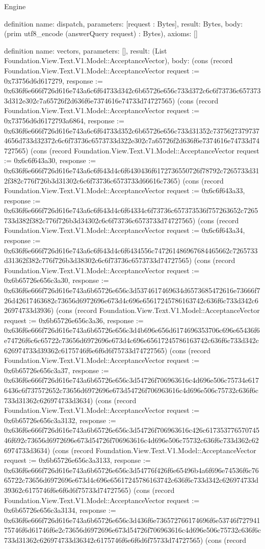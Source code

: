 \begin{lexlean}{Engine}
\begin{semanticmodule}
definition{
  name: dispatch,
  parameters: [request : Bytes],
  result: Bytes,
  body: (prim utf8_encode (answerQuery request) : Bytes),
  axioms: []
}

definition{
  name: vectors,
  parameters: [],
  result: (List Foundation.View.Text.V1.Model::AcceptanceVector),
  body: (cons (record Foundation.View.Text.V1.Model::AcceptanceVector {request := 0x73756d6d617279, response := 0x636f6e666f726d616e743a6c6f64733d342c6b65726e656c733d372c6c6f73736c6573733d312e302c7a65726f2d636f6e7374616e74733d74727565}) (cons (record Foundation.View.Text.V1.Model::AcceptanceVector {request := 0x73756d6d6172793a6864, response := 0x636f6e666f726d616e743a6c6f64733d352c6b65726e656c733d31352c73756273797374656d733d32372c6c6f73736c6573733d322e302c7a65726f2d636f6e7374616e74733d74727565}) (cons (record Foundation.View.Text.V1.Model::AcceptanceVector {request := 0x6c6f643a30, response := 0x636f6e666f726d616e743a6c6f643d4c6f6430436f6172736550726f78792c7265733d312f382c776f726b3d31302c6c6f73736c6573733d66616c7365}) (cons (record Foundation.View.Text.V1.Model::AcceptanceVector {request := 0x6c6f643a33, response := 0x636f6e666f726d616e743a6c6f643d4c6f64334c6f73736c657373536f757263652c7265733d382f382c776f726b3d34302c6c6f73736c6573733d74727565}) (cons (record Foundation.View.Text.V1.Model::AcceptanceVector {request := 0x6c6f643a34, response := 0x636f6e666f726d616e743a6c6f643d4c6f6434556c747261486967684465662c7265733d31362f382c776f726b3d38302c6c6f73736c6573733d74727565}) (cons (record Foundation.View.Text.V1.Model::AcceptanceVector {request := 0x6b65726e656c3a30, response := 0x636f6e666f726d616e743a6b65726e656c3d5374617469634d6573685472616e73666f726d42617463682c73656d6972696e673d4c696e65617245786163742c636f6c733d342c626974733d3936}) (cons (record Foundation.View.Text.V1.Model::AcceptanceVector {request := 0x6b65726e656c3a36, response := 0x636f6e666f726d616e743a6b65726e656c3d4b696e656d6174696353706c696e65436f6e74726f6c6c65722c73656d6972696e673d4c696e65617245786163742c636f6c733d342c626974733d39362c6175746f6e6f6d6f75733d74727565}) (cons (record Foundation.View.Text.V1.Model::AcceptanceVector {request := 0x6b65726e656c3a37, response := 0x636f6e666f726d616e743a6b65726e656c3d54726f706963616c4d696e506c75734e6176436c6f737572652c73656d6972696e673d54726f706963616c4d696e506c75732c636f6c733d31362c626974733d3634}) (cons (record Foundation.View.Text.V1.Model::AcceptanceVector {request := 0x6b65726e656c3a3132, response := 0x636f6e666f726d616e743a6b65726e656c3d54726f706963616c426c61735377657074546f692c73656d6972696e673d54726f706963616c4d696e506c75732c636f6c733d362c626974733d3634}) (cons (record Foundation.View.Text.V1.Model::AcceptanceVector {request := 0x6b65726e656c3a3133, response := 0x636f6e666f726d616e743a6b65726e656c3d54776f426f6e65496b4a6f696e74536f6c7665722c73656d6972696e673d4c696e65617245786163742c636f6c733d342c626974733d39362c6175746f6e6f6d6f75733d74727565}) (cons (record Foundation.View.Text.V1.Model::AcceptanceVector {request := 0x6b65726e656c3a3134, response := 0x636f6e666f726d616e743a6b65726e656c3d436f6e736572766174696f6e53746f72794175746f6d61746f6e2c73656d6972696e673d54726f706963616c4d696e506c75732c636f6c733d31362c626974733d36342c6175746f6e6f6d6f75733d74727565}) (cons (record }
\end{semanticmodule}
\end{lexlean}
